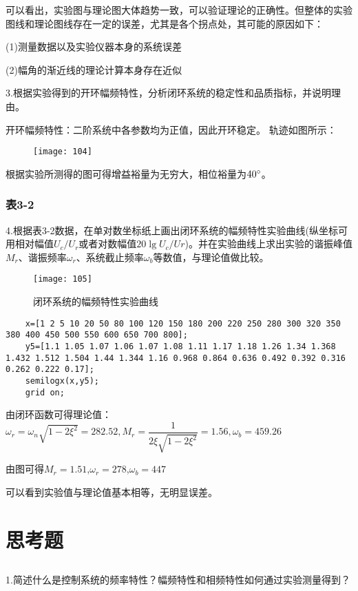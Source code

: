 \documentclass[UTF8,a4paper,10pt]{ctexart}
\begin{document}
	可以看出，实验图与理论图大体趋势一致，可以验证理论的正确性。但整体的实验图线和理论图线存在一定的误差，尤其是各个拐点处，其可能的原因如下：
	
	(1)测量数据以及实验仪器本身的系统误差
	
	(2)幅角的渐近线的理论计算本身存在近似
	
	3.根据实验得到的开环幅频特性，分析闭环系统的稳定性和品质指标，并说明理由。
	
	开环幅频特性：二阶系统中各参数均为正值，因此开环稳定。
	轨迹如图所示：
	\begin{figure}[h]
		\centering
		\texttt{[image: 104]}
		\caption{}
	\end{figure}

	根据实验所测得的图可得增益裕量为无穷大，相位裕量为$40\degree$。
	\subsubsection{表3-2}
	4.根据表3-2数据，在单对数坐标纸上画出闭环系统的幅频特性实验曲线(纵坐标可用相对幅值$U_{c}/U_{r}$或者对数幅值$20\lg U_{c}/U{r}$)。并在实验曲线上求出实验的谐振峰值$M_{r}$、谐振频率$\omega_{r}$、系统截止频率$\omega_{b}$等数值，与理论值做比较。
	\begin{figure}[h]
		\centering
		\texttt{[image: 105]}
		\caption{闭环系统的幅频特性实验曲线}
	\end{figure}
	\begin{lstlisting}
	x=[1 2 5 10 20 50 80 100 120 150 180 200 220 250 280 300 320 350 380 400 450 500 550 600 650 700 800];
	y5=[1.1 1.05 1.07 1.06 1.07 1.08 1.11 1.17 1.18 1.26 1.34 1.368 1.432 1.512 1.504 1.44 1.344 1.16 0.968 0.864 0.636 0.492 0.392 0.316 0.262 0.222 0.17];
	semilogx(x,y5);
	grid on;
	\end{lstlisting}
	
	由闭环函数可得理论值：$\omega_{r}=\omega_{n}\sqrt{1-2\xi^2}=282.52,M_{r}=\dfrac{1}{2\xi\sqrt{1-2\xi^2}}=1.56,\omega_{b}=459.26$
	
	由图可得$M_{r}=1.51$,$\omega_{r}=278$,$\omega_{b}=447$
	
	可以看到实验值与理论值基本相等，无明显误差。
	\section{思考题}
	\subsection{}
	1.简述什么是控制系统的频率特性？幅频特性和相频特性如何通过实验测量得到？
	
\end{document}
